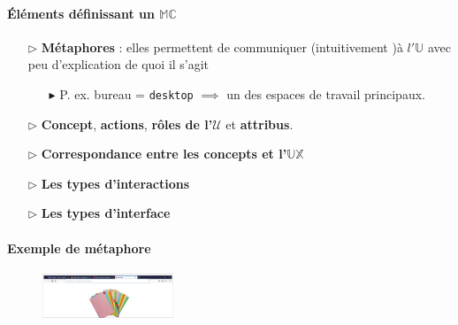 \documentclass{report}
\begin{document}
\begin{multicols*}{3}
\begin{itemize}
    \paragraph{Éléments définissant un 
    $\mathbb{MC}$}

    \begin{itemize}
    \item [$\rhd $] \textbf{Métaphores} : elles 
      permettent de communiquer 
      (intuitivement )à
      $l'\mathbb{U}$ avec peu d'explication 
     de quoi il 
      s'agit
      \begin{itemize}
        \item [$\blacktriangleright$ ]
          P. ex. bureau = \texttt{desktop}
          $\implies$ un des espaces de 
          travail principaux. 
      \end{itemize}
    \item [$\rhd$ ]
      \textbf{Concept}, \textbf{actions}, 
      \textbf{rôles de l'$\mathcal{U}$} et 
      \textbf{attribus}. 
     \item [$\rhd$ ]
       \textbf{Correspondance entre les concepts et 
       l'$\mathbb{UX}$}  
    \item [$\rhd$ ] 
      \textbf{Les types d'interactions}  
    \item [$\rhd$ ]
      \textbf{Les types d'interface}  
    \end{itemize}


    \paragraph{Exemple de métaphore}

    \begin{figure}[H]
      \begin{center}
        \includegraphics[width=0.35\textwidth]{Metaphore.png}
      \end{center}
    \end{figure}


\end{itemize}
\end{multicols*}
\end{document}
